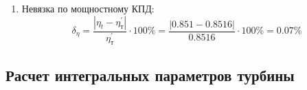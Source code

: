 \documentclass[a4paper,10pt]{article}
\begin{document}
\begin{enumerate}
\begin{enumerate}
        \end{enumerate}

        

        \item Невязка по мощностному КПД:
        \[
            \delta_\eta = \frac{ \left| \eta_t - \eta_т^\prime \right| }{ \eta_т^\prime } \cdot 100 \% =
                \frac{
                    \left| 0.851 - 0.8516 \right|
                }{
                    0.8516 } \cdot 100 \% =
            0.07 \%
        \]

    \end{enumerate}
     

    \subsection{Расчет интегральных параметров турбины}

    
\end{document}
